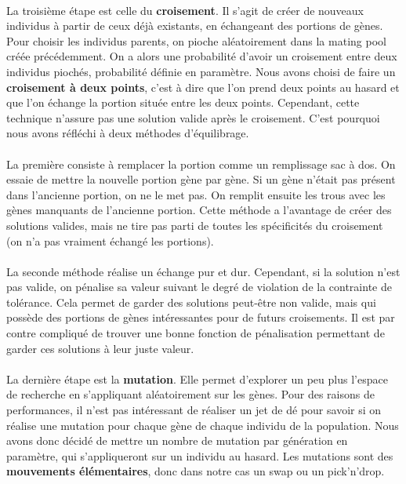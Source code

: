 \documentclass[12pt]{article}
\begin{document}
\paragraph{}La troisième étape est celle du \textbf{croisement}. Il s'agit de créer de nouveaux individus à partir de ceux déjà existants, en échangeant des portions de gènes. Pour choisir les individus parents, on pioche aléatoirement dans la mating pool créée précédemment. On a alors une probabilité d'avoir un croisement entre deux individus piochés, probabilité définie en paramètre. Nous avons choisi de faire un \textbf{croisement à deux points}, c'est à dire que l'on prend deux points au hasard et que l'on échange la portion située entre les deux points. Cependant, cette technique n'assure pas une solution valide après le croisement. C'est pourquoi nous avons réfléchi à deux méthodes d'équilibrage.
\paragraph{}La première consiste à remplacer la portion comme un remplissage sac à dos. On essaie de mettre la nouvelle portion gène par gène. Si un gène n'était pas présent dans l'ancienne portion, on ne le met pas. On remplit ensuite les trous avec les gènes manquants de l'ancienne portion. Cette méthode a l'avantage de créer des solutions valides, mais ne tire pas parti de toutes les spécificités du croisement (on n'a pas vraiment échangé les portions).
\paragraph{}La seconde méthode réalise un échange pur et dur. Cependant, si la solution n'est pas valide, on pénalise sa valeur suivant le degré de violation de la contrainte de tolérance. Cela permet de garder des solutions peut-être non valide, mais qui possède des portions de gènes intéressantes pour de futurs croisements. Il est par contre compliqué de trouver une bonne fonction de pénalisation permettant de garder ces solutions à leur juste valeur.

\paragraph{}La dernière étape est la \textbf{mutation}. Elle permet d'explorer un peu plus l'espace de recherche en s'appliquant aléatoirement sur les gènes. Pour des raisons de performances, il n'est pas intéressant de réaliser un jet de dé pour savoir si on réalise une mutation pour chaque gène de chaque individu de la population. Nous avons donc décidé de mettre un nombre de mutation par génération en paramètre, qui s'appliqueront sur un individu au hasard. Les mutations sont des \textbf{mouvements élémentaires}, donc dans notre cas un swap ou un pick'n'drop.
\end{document}
